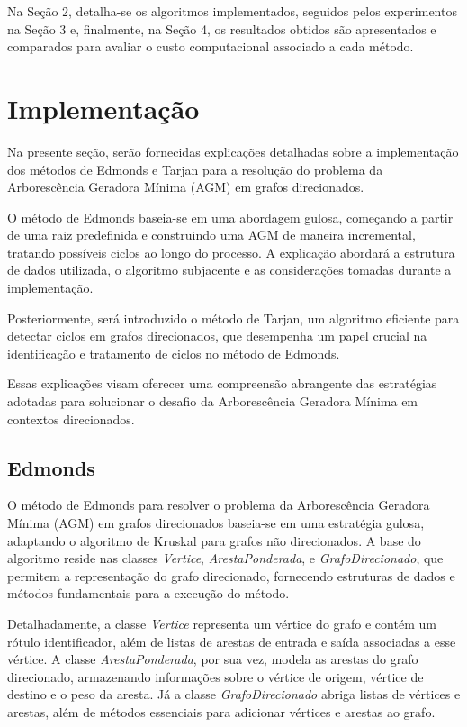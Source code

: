 \documentclass[12pt]{article}
\begin{document}
Na Seção 2, detalha-se os algoritmos implementados, seguidos pelos experimentos na Seção 3 e, finalmente, na Seção 4, os resultados obtidos são apresentados e comparados para avaliar o custo computacional associado a cada método.


\section{Implementação}

Na presente seção, serão fornecidas explicações detalhadas sobre a implementação dos métodos de Edmonds e Tarjan para a resolução do problema da Arborescência Geradora Mínima (AGM) em grafos direcionados. 

O método de Edmonds baseia-se em uma abordagem gulosa, começando a partir de uma raiz predefinida e construindo uma AGM de maneira incremental, tratando possíveis ciclos ao longo do processo. A explicação abordará a estrutura de dados utilizada, o algoritmo subjacente e as considerações tomadas durante a implementação. 

Posteriormente, será introduzido o método de Tarjan, um algoritmo eficiente para detectar ciclos em grafos direcionados, que desempenha um papel crucial na identificação e tratamento de ciclos no método de Edmonds. 

Essas explicações visam oferecer uma compreensão abrangente das estratégias adotadas para solucionar o desafio da Arborescência Geradora Mínima em contextos direcionados.

\subsection{Edmonds}

O método de Edmonds para resolver o problema da Arborescência Geradora Mínima (AGM) em grafos direcionados baseia-se em uma estratégia gulosa, adaptando o algoritmo de Kruskal para grafos não direcionados. A base do algoritmo reside nas classes \textit{Vertice}, \textit{ArestaPonderada}, e \textit{GrafoDirecionado}, que permitem a representação do grafo direcionado, fornecendo estruturas de dados e métodos fundamentais para a execução do método.

Detalhadamente, a classe \textit{Vertice} representa um vértice do grafo e contém um rótulo identificador, além de listas de arestas de entrada e saída associadas a esse vértice. A classe \textit{ArestaPonderada}, por sua vez, modela as arestas do grafo direcionado, armazenando informações sobre o vértice de origem, vértice de destino e o peso da aresta. Já a classe \textit{GrafoDirecionado} abriga listas de vértices e arestas, além de métodos essenciais para adicionar vértices e arestas ao grafo.
\end{document}
